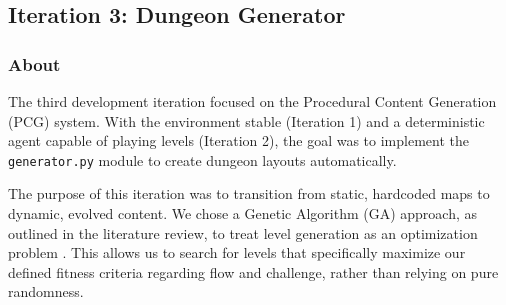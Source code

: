\subsection{Iteration 3: Dungeon Generator}
\subsubsection{About}
The third development iteration focused on the Procedural Content Generation (PCG) system.
With the environment stable (Iteration 1) and a deterministic agent capable of playing levels (Iteration 2), the goal was to implement the \texttt{generator.py} module to create dungeon layouts automatically.

The purpose of this iteration was to transition from static, hardcoded maps to dynamic, evolved content.
We chose a Genetic Algorithm (GA) approach, as outlined in the literature review, to treat level generation as an optimization problem \cite{Experience_Driven_PCG}.
This allows us to search for levels that specifically maximize our defined fitness criteria regarding flow and challenge, rather than relying on pure randomness.

